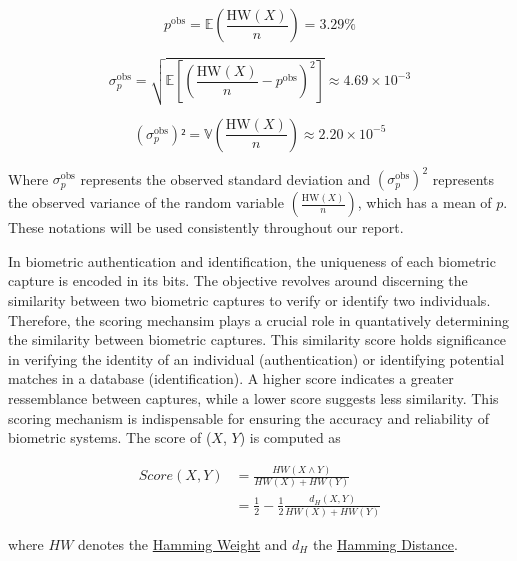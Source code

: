 \begin{equation} \label{eq:proba1}
    p^{\text{obs}} = \mathbb{E}\left( \frac{\text{HW}(X)}{n} \right) = 3.29\%
\end{equation}

\begin{equation} \label{eq:proba2}
    \sigma_{p}^{\text{obs}} = \sqrt{\mathbb{E} \left[ \left( \frac{\text{HW}(X)}{n} - p^{\text{obs}} \right)^2 \right]} \approx 4.69 \times 10^{-3}
\end{equation}


\begin{equation} \label{eq:proba3}
    (\sigma_{p}^{\text{obs}})² = \mathbb{V}\left( \frac{\text{HW}(X)}{n} \right)  \approx 2.20 \times 10^{-5}
\end{equation}

Where \( \sigma_{p}^{\text{obs}} \) represents the observed standard deviation and \( (\sigma_{p}^{\text{obs}})^2 \) represents the observed variance of the random variable \(\left( \frac{\text{HW}(X)}{n} \right)\), which has a mean of \(p\). These notations will be used consistently throughout our report.

In biometric authentication and identification, the uniqueness of each biometric capture is encoded in its bits. The objective revolves around discerning the similarity between two biometric captures to verify or identify two individuals. Therefore, the scoring mechansim plays a crucial role in quantatively determining the similarity between biometric captures. This similarity score holds significance in verifying the identity of an individual (authentication) or identifying potential matches in a database (identification). A higher score indicates a greater ressemblance between captures, while a lower score suggests less similarity. This scoring mechanism is indispensable for ensuring the accuracy and reliability of biometric systems. The score of (\(X\), \(Y\)) is computed as

\begin{equation} \label{eq:score}
    \begin{aligned}
        Score(X, Y) &= \frac{HW(X \land Y)}{HW(X) + HW(Y)}\\
        &= \frac{1}{2}-\frac{1}{2}\frac{d_H(X, Y)}{HW(X) + HW(Y)}
    \end{aligned}
\end{equation}

where \(HW\) denotes the \hyperref[def:Hamming Weight]{Hamming Weight} and \(d_H\) the \hyperref[def:Hamming Distance]{Hamming Distance}. 

